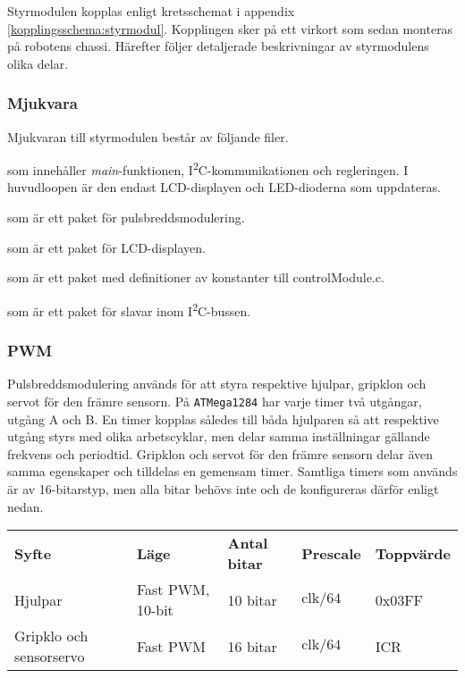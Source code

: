 \documentclass[11pt]{article}
\begin{document}
\begin{flushleft}
Styrmodulen kopplas enligt kretsschemat i appendix \ref{kopplingsschema:styrmodul}. Kopplingen sker på ett virkort som sedan monteras på robotens chassi. Härefter följer detaljerade beskrivningar av styrmodulens olika delar.

\subsubsection{Mjukvara}
Mjukvaran till styrmodulen består av följande filer.
\begin{description}[style=unboxed, leftmargin=0cm]
  \item[controlModule.c] som innehåller \textit{main}-funktionen, I\textsuperscript{2}C-kommunikationen och regleringen. I huvudloopen är den endast LCD-displayen och LED-dioderna som uppdateras.
  \item[PWM.h] som är ett paket för pulsbreddsmodulering.
  \item[LCD.h] som är ett paket för LCD-displayen.
  \item[constants.h] som är ett paket med definitioner av konstanter till controlModule.c.
  \item[I2C\_slave.h] som är ett paket för slavar inom I\textsuperscript{2}C-bussen.

\end{description}


\subsubsection{PWM}
Pulsbreddsmodulering används för att styra respektive hjulpar, gripklon och servot för den främre sensorn. På \verb+ATMega1284+ har varje timer två utgångar, utgång A och B. En timer kopplas således till båda hjulparen så att respektive utgång styrs med olika arbetscyklar, men delar samma inställningar gällande frekvens och periodtid. Gripklon och servot för den främre sensorn delar även samma egenskaper och tilldelas en gemensam timer. Samtliga timers som används är av 16-bitarstyp, men alla bitar behövs inte och de konfigureras därför enligt nedan. 

\begin{center}
\begin{tabular}{l l l l l}

    \textbf{Syfte} & \textbf{Läge} & \textbf{Antal bitar} & \textbf{Prescale} & \textbf{Toppvärde} \\
    Hjulpar & Fast PWM, 10-bit & 10 bitar & $\text{clk}/64$ &  0x03FF \\
	Gripklo och sensorservo & Fast PWM & 16 bitar & $\text{clk}/64$  & ICR \\
\end{tabular}
\end{center}


\end{flushleft}
\end{document}
